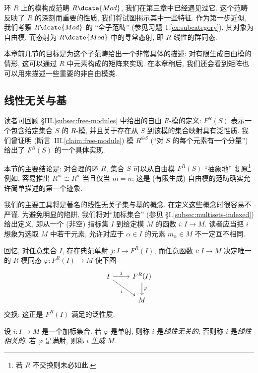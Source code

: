 环 $R$ 上的模构成范畴 $R\dcate{Mod}$, 我们在第三章中已经遇见过它. 这个范畴反映了 $R$ 的深刻而重要的性质, 我们将试图揭示其中一些特征. 作为第一步近似, 我们考察 $R\dcate{Mod}$ 的 ``全子范畴'' (参见习题~I.\ref{ex:subcategory}), 其对象为自由模, 而态射为 $R\dcate{Mod}$ 中的寻常态射, 即 $R$-线性的群同态.

本章前几节的目标是为这个子范畴给出一个非常具体的描述: 对有限生成自由模的情形, 这可以通过 $R$ 中元素构成的矩阵来实现. 在本章稍后, 我们还会看到矩阵也可以用来描述一些重要的非自由模类.

\subsection{线性无关与基}
\label{subsec:linear-independence-bases}

读者可回顾 §III.\ref{subsec:free-modules} 中给出的自由 $R$-模的定义: $F^R(S)$ 表示一个包含给定集合 $S$ 的 $R$-模, 并且关于存在从 $S$ 到该模的集合映射具有泛性质. 我们曾证明 (断言~III.\ref{claim:free-module}) 模 $R^{\oplus S}$ (``对 $S$ 的每个元素有一个分量'') 给出了 $F^R(S)$ 的一个具体实现.

本节的主要结论是: 对合理的环 $R$, 集合 $S$ 可以从自由模 $F^R(S)$ ``抽象地'' 复原\footnote{若 $R$ 不交换则未必如此.}. 例如, 容易推出 $R^m\cong R^n$ 当且仅当 $m=n$; 这是 (有限生成) 自由模的范畴确实允许简单描述的第一个迹象.

我们的主要工具将是著名的线性无关子集与基的概念. 在定义这些概念时很容易不严谨. 为避免明显的陷阱, 我们将对``加标集合'' (参见 §I.\ref{subsec:multisets-indexed}) 给出定义, 即从一个 (非空) 指标集 $I$ 到给定模 $M$ 的函数 $i:I\to M$. 读者应当把 $i$ 想象为选取 $M$ 中若干元素, 允许对应于 $\alpha\in I$ 的元素 $m_\alpha\in M$ 不一定互不相同.

回忆, 对任意集合 $I$, 存在典范单射 $j:I\to F^R(I)$, 而任意函数 $i:I\to M$ 决定唯一的 $R$-模同态 $\varphi:F^R(I)\to M$ 使下图
\[
\begin{tikzcd}
I \arrow[r, "j"] \arrow[dr, "i"'] & F^R(I) \arrow[d, "\varphi"] \\
& M
\end{tikzcd}
\]
交换: 这正是 $F^R(I)$ 满足的泛性质.

\begin{definition}\label{def:linearly-independent}
设 $i:I\to M$ 是一个加标集合. 若 $\varphi$ 是单射, 则称 $i$ 是\emph{线性无关的}; 否则称 $i$ 是\emph{线性相关的}. 若 $\varphi$ 是满射, 则称 $i$ \emph{生成} $M$.
\end{definition}

